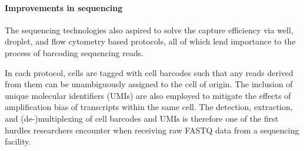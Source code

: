 




\paragraph{Improvements in sequencing}
The sequencing technologies also aspired to solve the capture efficiency via well, droplet, and flow cytometry based protocols, all of which lend importance to the process of barcoding sequencing reads. 

In each protocol, cells are tagged with cell barcodes such that any reads derived from them can be unambiguously assigned to the cell of origin. The inclusion of unique molecular identifiers (UMIs) are also employed to mitigate the effects of amplification bias of transcripts within the same cell. The detection, extraction, and (de-)multiplexing of cell barcodes and UMIs is therefore one of the first hurdles researchers encounter when receiving raw FASTQ data from a sequencing facility.


